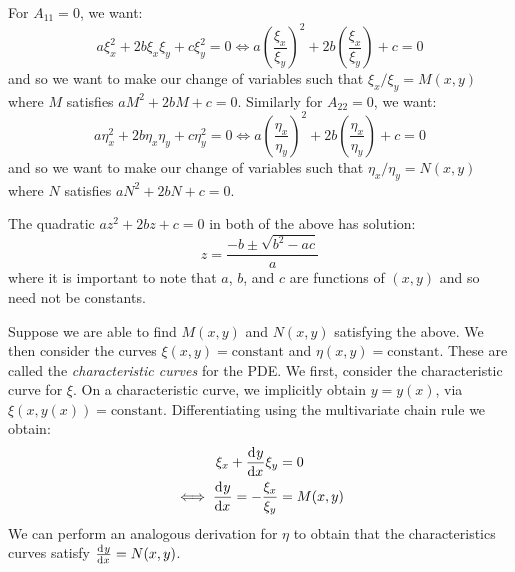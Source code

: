\documentclass[../main.tex]{subfiles}
\begin{document}
For $A_{1 1} = 0$, we want:
\[
  a \xi^2_x + 2b\xi_x\xi_y + c \xi^2_y = 0 \iff a\left(\frac{\xi_x}{\xi_y}\right)^2 + 2b \left(\frac{\xi_x}{\xi_y}\right) + c = 0
\]
and so we want to make our change of variables such that $\xi_x/\xi_y = M(x, y)$ where $M$ satisfies $aM^2 + 2bM + c = 0$.
Similarly for $A_{2 2} = 0$, we want:
\[
  a \eta^2_x + 2b\eta_x\eta_y + c \eta^2_y = 0 \iff  a\left(\frac{\eta_x}{\eta_y}\right)^2 + 2b \left(\frac{\eta_x}{\eta_y}\right) + c = 0
\]
and so we want to make our change of variables such that $\eta_x/\eta_y = N(x, y)$ where $N$ satisfies $aN^2 + 2bN + c = 0$.

The quadratic $az^2 + 2bz + c = 0$ in both of the above has solution:
\[
  z = \frac{-b \pm \sqrt{b^2 - ac}}{a}
\]
where it is important to note that $a$, $b$, and $c$ are functions of $(x, y)$ and so need not be constants.

Suppose we are able to find $M(x, y)$ and $N(x, y)$ satisfying the above.
We then consider the curves $\xi(x, y) = \text{constant}$ and $\eta(x, y) = \text{constant}$.
These are called the \textit{characteristic curves} for the PDE.
We first, consider the characteristic curve for $\xi$.
On a characteristic curve, we implicitly obtain $y = y(x)$, via $\xi(x, y(x)) = \text{constant}$.
Differentiating using the multivariate chain rule we obtain:
\begin{align*}
  \xi_x + \deriv{y}{x} \xi_y &= 0 \\
  \iff \deriv{y}{x} = - \frac{\xi_x}{\xi_y} &= M(x, y)
\end{align*}
We can perform an analogous derivation for $\eta$ to obtain that the characteristics curves satisfy $\deriv{y}{x} = N(x, y)$.
\end{document}

